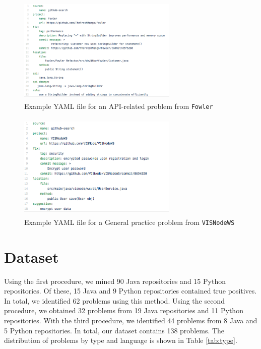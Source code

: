 \documentclass[sigconf]{acmart}
\begin{document}
\begin{figure}
  \includegraphics[height=2in, width=3in]{YAMLmetadata}
  \caption{Example YAML file for an API-related problem from \texttt{Fowler}}
  \label{fig:meta1}
\end{figure}


\begin{figure}
  \includegraphics[height=2in, width=3in]{YAMLmetadata2}
  \caption{Example YAML file for a General practice problem from \texttt{VISNodeWS}}
  \label{fig:meta2}
\end{figure}

\section{Dataset}

Using the first procedure, we mined 90 Java repositories and 15 Python repositories. Of these, 15 Java and 9 Python repositories contained true positives. In total, we identified 62 problems using this method. Using the second procedure, we obtained 32 problems from 19 Java repositories and 11 Python repositories. With the third procedure, we identified 44 problems from 8 Java and 5 Python repositories. In total, our dataset contains 138 problems. The distribution of problems by type and language is shown in Table \ref{tab:type}.
\end{document}
